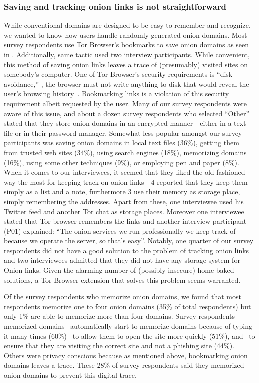 \subsubsection{Saving and tracking onion links is not straightforward}
While conventional domains are designed to be easy to remember and recognize, we wanted to know how users handle randomly-generated onion domains. Most survey respondents use Tor Browser's bookmarks to save onion domains as seen in . Additionally, same tactic used two interview participants.   While
convenient, this method of saving onion links leaves a trace of (presumably) visited sites on somebody's
computer.  One of Tor Browser's security requirements is ``disk avoidance,''
\ie, the browser must not write anything to disk that would reveal the user's
browsing history~\cite[\S~2.1]{Perry2017a}.  Bookmarking links is a violation of
this security requirement albeit requested by the user.  Many of our survey respondents
were aware of this issue, and about a dozen survey respondents who selected ``Other'' stated that they store onion domains in an encrypted manner---either in a text file or in their password manager.  Somewhat less popular amongst our survey participants was saving onion domains in local text files (36\%), getting them from trusted web sites (34\%), using search engines (18\%), memorizing domains (16\%), using some other 
techniques (9\%), or employing pen and paper (8\%).  When it comes to our interviewees, it seemed that they liked the old fashioned way the most for keeping track on onion links  - 4 reported that they keep them simply as a list and a note, furthermore 3 use their memory as storage place, simply remembering the addresses. Apart from these, one interviewee used his Twitter feed and another Tor chat as storage places. Moreover one interviewee stated that Tor browser remembers the links and another interview participant (P01) explained: “The onion services we run professionally we keep track of because we operate the server, so that's easy”. Notably, one quarter of our survey
respondents did not have a good solution to the problem of tracking onion links and  two interviewees admitted that they did not have any storage system for Onion links.
Given the alarming
number of (possibly insecure) home-baked solutions, a Tor Browser extension that
solves this problem seems warranted.

Of the survey respondents who memorize onion domains, we found that most respondents
memorize one to four onion domains (35\% of total respondents) but only 1\% are able to memorize more than four domains.   Survey respondents memorized domains \first~automatically start to memorize domains
because of typing it many times (60\%)
\second~to allow them to open the site more
quickly (51\%), and \third~to ensure that they are visiting the correct site and
not a phishing site (44\%). Others were privacy conscious because as mentioned above,
bookmarking onion domains leaves a trace. These 28\% of survey respondents said
they memorized onion domains to prevent this digital trace.

